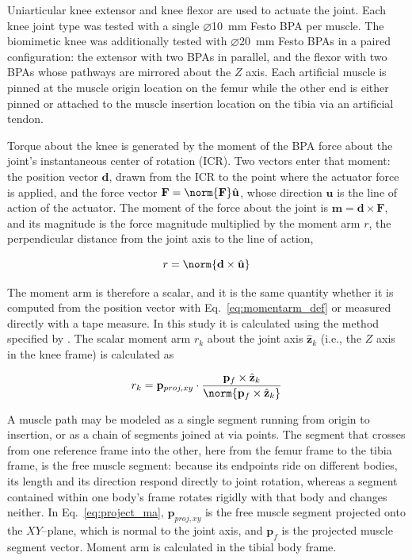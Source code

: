 Uniarticular knee extensor and knee flexor are used to actuate the joint. Each knee joint type was tested with a single $\diameter$\qty{10}{\mm} Festo BPA per muscle. The biomimetic knee was additionally tested with $\diameter$\qty{20}{\mm} Festo BPAs in a paired configuration: the extensor with two BPAs in parallel, and the flexor with two BPAs whose pathways are mirrored about the $Z$ axis. Each artificial muscle is pinned at the muscle origin location on the femur while the other end is either pinned or attached to the muscle insertion location on the tibia via an artificial tendon.

Torque about the knee is generated by the moment of the BPA force about the joint's instantaneous center of rotation (ICR). Two vectors enter that moment: the position vector $\mathbf{d}$, drawn from the ICR to the point where the actuator force is applied, and the force vector $\mathbf{F} = \norm{\mathbf{F}}\hat{\mathbf{u}}$, whose direction $\hat{\mathbf{u}}$ is the line of action of the actuator. The moment of the force about the joint is $\mathbf{m} = \mathbf{d} \times \mathbf{F}$, and its magnitude is the force magnitude multiplied by the moment arm $r$, the perpendicular distance from the joint axis to the line of action,

\begin{equation}
    r = \norm{\mathbf{d} \times \hat{\mathbf{u}}}
    \label{eq:momentarm_def}
\end{equation}

The moment arm is therefore a scalar, and it is the same quantity whether it is computed from the position vector with Eq.~\eqref{eq:momentarm_def} or measured directly with a tape measure. In this study it is calculated using the method specified by \citet{young_analyzing_2019}. The scalar moment arm $r_{k}$ about the joint axis $\hat{\mathbf{z}}_{k}$ (i.e., the $Z$ axis in the knee frame) is calculated as 

\begin{equation}
    r_{k} = \mathbf{p}_{proj,xy} \cdot \frac{\mathbf{p}_{f} \times \hat{\mathbf{z}}_{k}} { \norm{\mathbf{p}_{f} \times \hat{\mathbf{z}}_{k}} } \label{eq:project_ma}
\end{equation}

A muscle path may be modeled as a single segment running from origin to insertion, or as a chain of segments joined at via points. The segment that crosses from one reference frame into the other, here from the femur frame to the tibia frame, is the free muscle segment: because its endpoints ride on different bodies, its length and its direction respond directly to joint rotation, whereas a segment contained within one body's frame rotates rigidly with that body and changes neither. In Eq.~\eqref{eq:project_ma}, $\mathbf{p}_{proj,xy}$ is the free muscle segment projected onto the $XY$--plane, which is normal to the joint axis, and $\mathbf{p}_{f}$ is the projected muscle segment vector. Moment arm is calculated in the tibial body frame.

